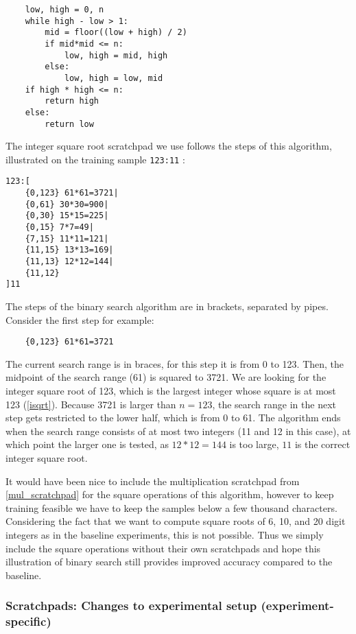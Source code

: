 \begin{lstlisting}
    low, high = 0, n
    while high - low > 1:
        mid = floor((low + high) / 2)
        if mid*mid <= n:
            low, high = mid, high
        else:
            low, high = low, mid 
    if high * high <= n:
        return high
    else:
        return low
\end{lstlisting}

\noindent
The integer square root scratchpad we use follows the steps of this algorithm, illustrated on the training sample \verb|123:11| :

\begin{lstlisting}
123:[
    {0,123} 61*61=3721| 
    {0,61} 30*30=900|
    {0,30} 15*15=225|
    {0,15} 7*7=49|
    {7,15} 11*11=121|
    {11,15} 13*13=169|
    {11,13} 12*12=144|
    {11,12}
]11
\end{lstlisting}

The steps of the binary search algorithm are in brackets, separated by pipes.
Consider the first step for example:

\begin{lstlisting}
	{0,123} 61*61=3721
\end{lstlisting}

The current search range is in braces, for this step it is from 0 to 123.
Then, the midpoint of the search range (61) is squared to 3721.
We are looking for the integer square root of 123, which is the largest integer whose square is at most 123 (\cref{isqrt}). Because 3721 is larger than $n=123$, the search range in the next step gets restricted to the lower half, which is from 0 to 61.
The algorithm ends when the search range consists of at most two integers (11 and 12 in this case), at which point the larger one is tested, as $12*12=144$ is too large, $11$ is the correct integer square root.


It would have been nice to include the multiplication scratchpad from \cref{mul_scratchpad} for the square operations of this algorithm, however to keep training feasible we have to keep the samples below a few thousand characters. Considering the fact that we want to compute square roots of 6, 10, and 20 digit integers as in the baseline experiments, this is not possible.
Thus we simply include the square operations without their own scratchpads and hope this illustration of binary search still provides improved accuracy compared to the baseline.


\subsubsection{Scratchpads: Changes to experimental setup (experiment-specific)}
\label{scratchpad_changes}

